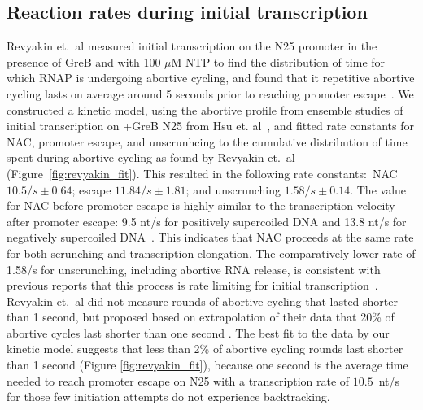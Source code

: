 %
\subsection{Reaction rates during initial transcription}
Revyakin et.\ al measured initial transcription on the N25
promoter in the presence of GreB and with 100 $\mu$M NTP to find the
distribution of time for which RNAP is undergoing abortive cycling, and found
that it repetitive abortive cycling lasts on average around 5 seconds prior to
reaching promoter escape~\cite{revyakin_abortive_2006}. We constructed a
kinetic model, using the abortive profile from ensemble studies of
initial transcription on +GreB N25 from Hsu et. al~\cite{hsu_initial_2006},
and fitted rate constants for NAC, promoter escape, and unscrunhcing to the
cumulative distribution of time spent during abortive cycling as found by
Revyakin et.\ al (Figure~\ref{fig:revyakin_fit}). This resulted in the
following rate constants:~NAC $10.5/s \pm 0.64$; escape $11.84/s \pm 1.81$;
and unscrunching $1.58/s \pm 0.14$. The value for NAC before promoter escape
is highly similar to the transcription velocity after promoter escape: 9.5
nt/s for positively supercoiled DNA and 13.8 nt/s for negatively supercoiled
DNA~\cite{revyakin_abortive_2006}. This indicates that NAC proceeds at the
same rate for both scrunching and transcription elongation. The comparatively
lower rate of 1.58/s for unscrunching, including abortive RNA release, is
consistent with previous reports that this process is rate limiting for
initial transcription~\cite{margeat_direct_2006, revyakin_abortive_2006}.
Revyakin et.\ al did not measure rounds of abortive cycling that lasted
shorter than 1 second, but proposed based on extrapolation of their data that
20\% of abortive cycles last shorter than one second
\cite{revyakin_abortive_2006}. The best fit to the data by our kinetic model
suggests that less than 2\% of abortive cycling rounds last shorter than 1
second (Figure \ref{fig:revyakin_fit}), because one second is the average time
needed to reach promoter escape on N25 with a transcription rate of
$10.5$~nt/s for those few initiation attempts do not experience backtracking.


